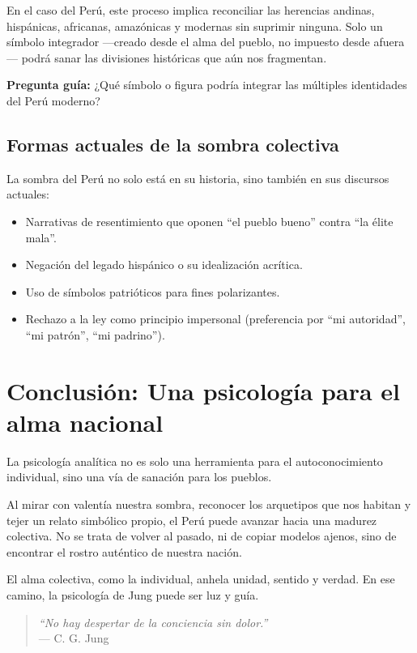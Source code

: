 En el caso del Perú, este proceso implica reconciliar las herencias andinas, hispánicas, africanas, amazónicas y modernas sin suprimir ninguna. Solo un símbolo integrador —creado desde el alma del pueblo, no impuesto desde afuera— podrá sanar las divisiones históricas que aún nos fragmentan.

\textbf{Pregunta guía:} ¿Qué símbolo o figura podría integrar las múltiples identidades del Perú moderno?

\subsection*{Formas actuales de la sombra colectiva}

La sombra del Perú no solo está en su historia, sino también en sus discursos actuales:

\begin{itemize}
	\item Narrativas de resentimiento que oponen “el pueblo bueno” contra “la élite mala”.
	\item Negación del legado hispánico o su idealización acrítica.
	\item Uso de símbolos patrióticos para fines polarizantes.
	\item Rechazo a la ley como principio impersonal (preferencia por “mi autoridad”, “mi patrón”, “mi padrino”).
\end{itemize}

\section*{Conclusión: Una psicología para el alma nacional}

La psicología analítica no es solo una herramienta para el autoconocimiento individual, sino una vía de sanación para los pueblos.

Al mirar con valentía nuestra sombra, reconocer los arquetipos que nos habitan y tejer un relato simbólico propio, el Perú puede avanzar hacia una madurez colectiva. No se trata de volver al pasado, ni de copiar modelos ajenos, sino de encontrar el rostro auténtico de nuestra nación.

El alma colectiva, como la individual, anhela unidad, sentido y verdad. En ese camino, la psicología de Jung puede ser luz y guía.

\begin{quote}
	\emph{“No hay despertar de la conciencia sin dolor.”} \\ — C. G. Jung
\end{quote}